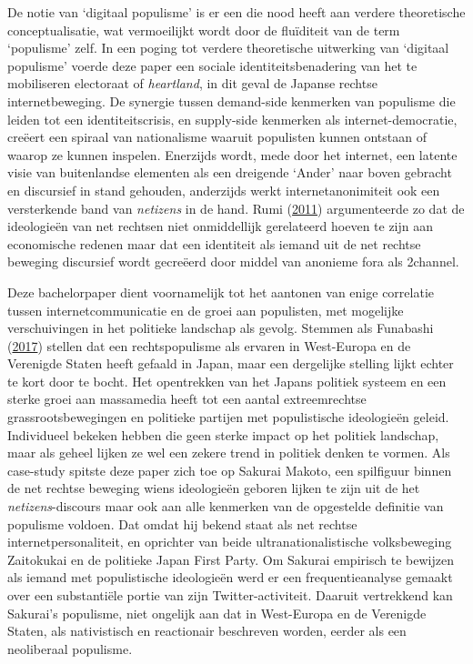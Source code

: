\documentclass[10.5pt,dutch,]{article}
\begin{document}
De notie van `digitaal populisme' is er een die nood heeft aan verdere
theoretische conceptualisatie, wat vermoeilijkt wordt door de fluïditeit
van de term `populisme' zelf. In een poging tot verdere theoretische
uitwerking van `digitaal populisme' voerde deze paper een sociale
identiteitsbenadering van het te mobiliseren electoraat of
\emph{heartland}, in dit geval de Japanse rechtse internetbeweging. De
synergie tussen demand-side kenmerken van populisme die leiden tot een
identiteitscrisis, en supply-side kenmerken als internet-democratie,
creëert een spiraal van nationalisme waaruit populisten kunnen ontstaan
of waarop ze kunnen inspelen. Enerzijds wordt, mede door het internet,
een latente visie van buitenlandse elementen als een dreigende `Ander'
naar boven gebracht en discursief in stand gehouden, anderzijds werkt
internetanonimiteit ook een versterkende band van \emph{netizens} in de
hand. Rumi (\protect\hyperlink{ref-rumiux5fkoreansux5f2011}{2011})
argumenteerde zo dat de ideologieën van net rechtsen niet onmiddellijk
gerelateerd hoeven te zijn aan economische redenen maar dat een
identiteit als iemand uit de net rechtse beweging discursief wordt
gecreëerd door middel van anonieme fora als 2channel.

Deze bachelorpaper dient voornamelijk tot het aantonen van enige
correlatie tussen internetcommunicatie en de groei aan populisten, met
mogelijke verschuivingen in het politieke landschap als gevolg. Stemmen
als Funabashi (\protect\hyperlink{ref-funabashiux5fjapanux5f2017}{2017})
stellen dat een rechtspopulisme als ervaren in West-Europa en de
Verenigde Staten heeft gefaald in Japan, maar een dergelijke stelling
lijkt echter te kort door te bocht. Het opentrekken van het Japans
politiek systeem en een sterke groei aan massamedia heeft tot een aantal
extreemrechtse grassrootsbewegingen en politieke partijen met
populistische ideologieën geleid. Individueel bekeken hebben die geen
sterke impact op het politiek landschap, maar als geheel lijken ze wel
een zekere trend in politiek denken te vormen. Als case-study spitste
deze paper zich toe op Sakurai Makoto, een spilfiguur binnen de net
rechtse beweging wiens ideologieën geboren lijken te zijn uit de het
\emph{netizens}-discours maar ook aan alle kenmerken van de opgestelde
definitie van populisme voldoen. Dat omdat hij bekend staat als net
rechtse internetpersonaliteit, en oprichter van beide
ultranationalistische volksbeweging Zaitokukai en de politieke Japan
First Party. Om Sakurai empirisch te bewijzen als iemand met
populistische ideologieën werd er een frequentieanalyse gemaakt over een
substantiële portie van zijn Twitter-activiteit. Daaruit vertrekkend kan
Sakurai's populisme, niet ongelijk aan dat in West-Europa en de
Verenigde Staten, als nativistisch en reactionair beschreven worden,
eerder als een neoliberaal populisme.
\end{document}
